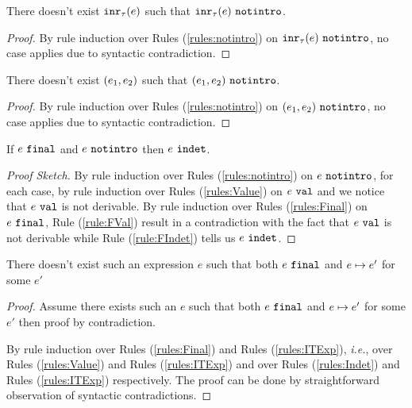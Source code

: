 \begin{lemma}
  \label{lem:no-inr-notintro}
  There doesn't exist $\mathtt{inr}_{\tau}({e})$ such that $\mathtt{inr}_{\tau}({e}) ~\mathtt{notintro}$.
\end{lemma}
\begin{proof}
    By rule induction over Rules (\ref{rules:notintro}) on $\mathtt{inr}_{\tau}({e}) ~\mathtt{notintro}$, no case applies due to syntactic contradiction.
\end{proof}

\begin{lemma}
  \label{lem:no-pair-notintro}
  There doesn't exist $(e_1 , e_2)$ such that $(e_1 , e_2) ~\mathtt{notintro}$.
\end{lemma}
\begin{proof}
    By rule induction over Rules (\ref{rules:notintro}) on $(e_1 , e_2) ~\mathtt{notintro}$, no case applies due to syntactic contradiction.
\end{proof}

\begin{lemma}
  \label{lem:final-notintro-indet}
  If $e ~\mathtt{final}$ and $e ~\mathtt{notintro}$ then $e ~\mathtt{indet}$.
\end{lemma}
\begin{proof}[Proof Sketch]
By rule induction over Rules (\ref{rules:notintro}) on  $e ~\mathtt{notintro}$, for each case, by rule induction over Rules (\ref{rules:Value}) on $e ~\mathtt{val}$ and we notice that $e ~\mathtt{val}$ is not derivable. By rule induction over Rules (\ref{rules:Final}) on $e ~\mathtt{final}$, Rule (\ref{rule:FVal}) result in a contradiction with the fact that $e ~\mathtt{val}$ is not derivable while Rule (\ref{rule:FIndet}) tells us $e ~\mathtt{indet}$.
\end{proof}

\begin{lemma}[Finality]
  \label{lem:finality}
  There doesn't exist such an expression $e$ such that both $e ~\mathtt{final}$ and $e \mapsto e'$ for some $e'$
\end{lemma}
\begin{proof}Assume there exists such an $e$ such that both $e ~\mathtt{final}$ and $e \mapsto e'$ for some $e'$ then proof by contradiction.
 
  By rule induction over Rules (\ref{rules:Final}) and Rules (\ref{rules:ITExp}), \textit{i.e.}, over Rules (\ref{rules:Value}) and Rules (\ref{rules:ITExp}) and over Rules (\ref{rules:Indet}) and Rules (\ref{rules:ITExp}) respectively. The proof can be done by straightforward observation of syntactic contradictions.
\end{proof}


